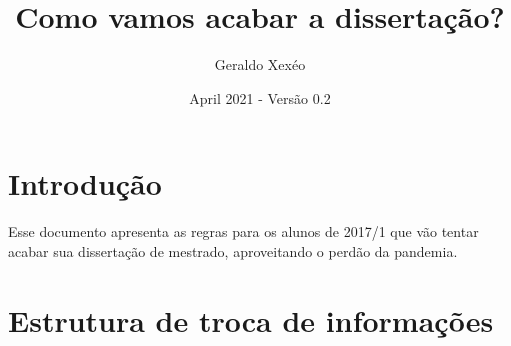 \documentclass{article}
\title{Como vamos acabar a dissertação?}
\author{Geraldo Xexéo}
\date{April 2021 - Versão 0.2}
\begin{document}
\maketitle

\section{Introdução}

Esse documento apresenta as regras para os alunos de 2017/1 que vão tentar acabar sua dissertação de mestrado, aproveitando o perdão da pandemia.

\section{Estrutura de troca de informações}
\end{document}
